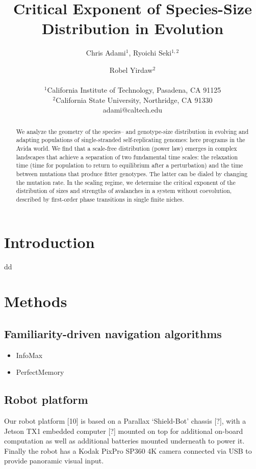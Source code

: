 \documentclass[letterpaper]{article}
\title{Critical Exponent of Species-Size Distribution in Evolution}
\author{Chris Adami$^{1}$, Ryoichi Seki$^{1,2}$ \and Robel Yirdaw$^2$ \\
\mbox{}\\
$^1$California Institute of Technology, Pasadena, CA 91125 \\
$^2$California State University, Northridge, CA 91330 \\
adami@caltech.edu} %
\begin{document}
\maketitle

\begin{abstract}
  We analyze the geometry of the species-- and genotype-size
  distribution in evolving and adapting populations of single-stranded
  self-replicating genomes: here programs in the Avida world.  We find
  that a scale-free distribution (power law) emerges in complex
  landscapes that achieve a separation of two fundamental time scales:
  the relaxation time (time for population to return to equilibrium
  after a perturbation) and the time between mutations that produce
  fitter genotypes. The latter can be dialed by changing the mutation
  rate.  In the scaling regime, we determine the
  critical exponent of the distribution of sizes and strengths of
  avalanches in a system without coevolution, described by first-order
  phase transitions in single finite niches.
\end{abstract}

\section{Introduction}
dd

\section{Methods}
\subsection{Familiarity-driven navigation algorithms}
\begin{itemize}
    \item InfoMax
    \item PerfectMemory
\end{itemize}

\subsection{Robot platform}
Our robot platform [10] is based on a Parallax ‘Shield-Bot’ chassis [?], with a Jetson TX1 embedded computer [?] mounted on top for additional on-board computation as well as additional batteries mounted underneath to power it. 
Finally the robot has a Kodak PixPro SP360 4K camera connected via USB to provide panoramic visual input.
\end{document}
